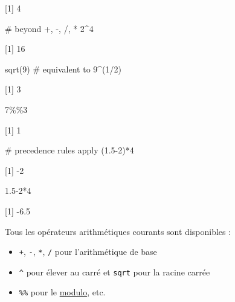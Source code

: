 \documentclass[
  letterpaper,
  DIV=11,
  numbers=noendperiod]{scrreprt}
\newenvironment{Shaded}{\begin{snugshade}}{\end{snugshade}}
\newcommand{\CommentTok}[1]{\textcolor[rgb]{0.37,0.37,0.37}{#1}}
\newcommand{\DecValTok}[1]{\textcolor[rgb]{0.68,0.00,0.00}{#1}}
\newcommand{\FloatTok}[1]{\textcolor[rgb]{0.68,0.00,0.00}{#1}}
\newcommand{\FunctionTok}[1]{\textcolor[rgb]{0.28,0.35,0.67}{#1}}
\newcommand{\NormalTok}[1]{\textcolor[rgb]{0.00,0.23,0.31}{#1}}
\newcommand{\SpecialCharTok}[1]{\textcolor[rgb]{0.37,0.37,0.37}{#1}}
\providecommand{\tightlist}{%
  \setlength{\itemsep}{0pt}\setlength{\parskip}{0pt}}\usepackage{longtable,booktabs,array}
\begin{document}
{[}1{]} 4

\begin{Shaded}
\begin{Highlighting}[]
\CommentTok{\# beyond +, {-}, /, *}
\DecValTok{2}\SpecialCharTok{\^{}}\DecValTok{4} 
\end{Highlighting}
\end{Shaded}

{[}1{]} 16

\begin{Shaded}
\begin{Highlighting}[]
\FunctionTok{sqrt}\NormalTok{(}\DecValTok{9}\NormalTok{) }\CommentTok{\# equivalent to 9\^{}(1/2)}
\end{Highlighting}
\end{Shaded}

{[}1{]} 3

\begin{Shaded}
\begin{Highlighting}[]
\DecValTok{7}\SpecialCharTok{\%\%}\DecValTok{3}
\end{Highlighting}
\end{Shaded}

{[}1{]} 1

\begin{Shaded}
\begin{Highlighting}[]
\CommentTok{\# precedence rules apply}
\NormalTok{(}\FloatTok{1.5}\DecValTok{{-}2}\NormalTok{)}\SpecialCharTok{*}\DecValTok{4}
\end{Highlighting}
\end{Shaded}

{[}1{]} -2

\begin{Shaded}
\begin{Highlighting}[]
\FloatTok{1.5}\DecValTok{{-}2}\SpecialCharTok{*}\DecValTok{4}
\end{Highlighting}
\end{Shaded}

{[}1{]} -6.5

Tous les opérateurs arithmétiques courants sont disponibles :

\begin{itemize}
\tightlist
\item
  \texttt{+}, \texttt{-}, \texttt{*}, \texttt{/} pour l'arithmétique de
  base
\item
  \texttt{\^{}} pour élever au carré et \texttt{sqrt} pour la racine
  carrée
\item
  \texttt{\%\%} pour le
  \href{https://fr.wikipedia.org/wiki/Modulo_(opération)}{modulo}, etc.
\end{itemize}
\end{document}
